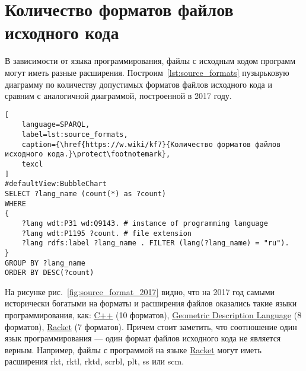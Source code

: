 \section{Количество форматов файлов исходного кода}
В зависимости от языка программирования, файлы с исходным кодом программ могут иметь разные расширения. Построим~\ref{lst:source_formats} пузырьковую диаграмму по количеству допустимых форматов файлов исходного кода и сравним с аналогичной диаграммой, построенной в 2017 году.

\pagebreak

\begin{lstlisting}[
	language=SPARQL,
	label=lst:source_formats,
	caption={\href{https://w.wiki/kf7}{Количество форматов файлов исходного кода.}\protect\footnotemark},
	texcl
]
#defaultView:BubbleChart
SELECT ?lang_name (count(*) as ?count)
WHERE
{
    ?lang wdt:P31 wd:Q9143. # instance of programming language
  	?lang wdt:P1195 ?count. # file extension
  	?lang rdfs:label ?lang_name . FILTER (lang(?lang_name) = "ru").
}
GROUP BY ?lang_name 
ORDER BY DESC(?count)
\end{lstlisting}

На рисунке рис.~\ref{fig:source_format_2017} видно, что на 2017 год самыми исторически богатыми на форматы и расширения файлов оказались такие языки программирования, как: \href{https://en.wikipedia.org/wiki/C++}{C++} (10 форматов), \href{https://en.wikipedia.org/wiki/Geometric_Description_Language}{Geometric Description Language} (8 форматов), \href{https://en.wikipedia.org/wiki/Racket_(programming_language)}{Racket} (7 форматов). Причем стоит заметить, что соотношение один язык программирования --- один формат файлов исходного кода не является верным. Например, файлы с программой на языке \href{https://en.wikipedia.org/wiki/Racket_(programming_language)}{Racket} могут иметь расширения rkt, rktl, rktd, scrbl, plt, ss или scm.

